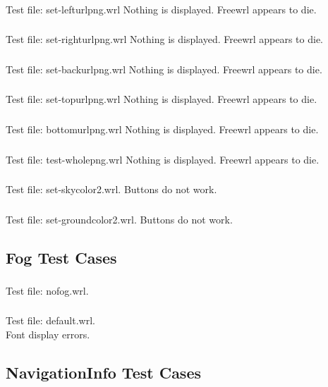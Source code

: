 \subsubsection{\BkgP}
Test file: set-lefturlpng.wrl
Nothing is displayed. Freewrl appears to die.

\subsubsection{\BkgQ}
Test file: set-righturlpng.wrl
Nothing is displayed. Freewrl appears to die.

\subsubsection{\BkgR}
Test file: set-backurlpng.wrl
Nothing is displayed. Freewrl appears to die.

\subsubsection{\BkgS}
Test file: set-topurlpng.wrl
Nothing is displayed. Freewrl appears to die.

\subsubsection{\BkgT}
Test file: bottomurlpng.wrl
Nothing is displayed. Freewrl appears to die.

\subsubsection{\BkgU}
Test file: test-wholepng.wrl
Nothing is displayed. Freewrl appears to die.

\subsubsection{\BkgV}
Test file: set-skycolor2.wrl.
Buttons do not work.

\subsubsection{\BkgWa\BkgWb}
Test file: set-groundcolor2.wrl.
Buttons do not work.

\subsection{Fog Test Cases}

\subsubsection{\FogA}
Test file: nofog.wrl.

\subsubsection{\FogB}
Test file: default.wrl.\\
Font display errors.

\subsection{NavigationInfo Test Cases}
